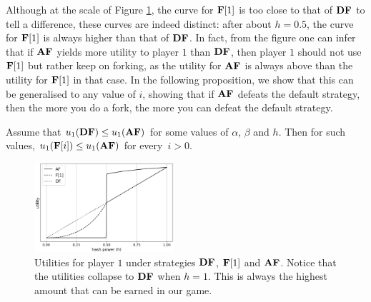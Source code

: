 Although at the scale of Figure \ref{fig-af-df-fo}, the curve for $\text{\rm {\bf F}[{$1$}]}$ is too close to that of $\text{\rm {\bf DF}}$ to tell a difference, these curves are indeed distinct: after about $h = 0.5$, the curve for $\text{\rm {\bf F}[{$1$}]}$ is always higher than that of $\text{\rm {\bf DF}}$. In fact, from the figure one can infer that if $\text{\rm {\bf AF}}$ yields more utility to player $1$ than $\text{\rm {\bf DF}}$, 
 then player $1$ should not use $\text{\rm {\bf F}[{$1$}]}$ but rather keep on forking, as 
the utility for $\text{\rm {\bf AF}}$ is always above than the utility for $\text{\rm {\bf F}[{$1$}]}$ in that case. In the following proposition, we show that this can be generalised to any value of $i$, showing that if $\text{\rm {\bf AF}}$ defeats the default strategy, then the more you do a fork, the more you can defeat the default strategy.
\begin{proposition}\label{prop-fork_fix}
Assume that $u_1(\text{\rm {\bf DF}}) \leq u_1(\text{\rm {\bf AF}})$ for some values of $\alpha$, $\beta$ and $h$. Then for such values,  $u_1(\text{\rm {\bf F}[{$i$}]}) \leq u_1(\text{\rm {\bf AF}})$ for every~$i > 0$.
\end{proposition}

\begin{figure}
  \centering
    \includegraphics[width=0.46\textwidth]{plots/test_AF.png}
    \caption{Utilities for player $1$ under strategies $\text{\rm {\bf DF}}$, $\text{\rm {\bf F}[{$1$}]}$ and $\text{\rm {\bf AF}}$. 
    Notice that the utilities collapse to $\text{\rm {\bf DF}}$ when $h = 1$. This is always the highest amount that can be earned in our game.}
        \label{fig-af-df-fo}
\end{figure}
%


